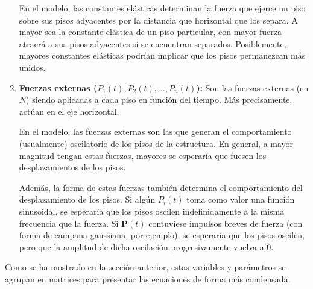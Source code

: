 \begin{enumerate}
        En el modelo, las constantes elásticas determinan la fuerza que ejerce un piso sobre sus pisos adyacentes por la distancia que horizontal que los separa. A mayor sea la constante elástica de un piso particular, con mayor fuerza atraerá a sus pisos adyacentes si se encuentran separados. Posiblemente, mayores constantes elásticas podrían implicar que los pisos permanezcan más unidos.

    \item \textbf{Fuerzas externas (\(P_1(t), P_2(t), \ldots, P_n(t)\)):} Son las fuerzas externas (en \(\si{N}\)) siendo aplicadas a cada piso en función del tiempo. Más precisamente, actúan en el eje horizontal.

        En el modelo, las fuerzas externas son las que generan el comportamiento (usualmente) oscilatorio de los pisos de la estructura. En general, a mayor magnitud tengan estas fuerzas, mayores se esperaría que fuesen los desplazamientos de los pisos.

        Además, la forma de estas fuerzas también determina el comportamiento del desplazamiento de los pisos. Si algún \(P_i(t)\) toma como valor una función sinusoidal, se esperaría que los pisos oscilen indefinidamente a la misma frecuencia que la fuerza. Si \(\mathbf{P}(t)\) contuviese impulsos breves de fuerza (con forma de campana gaussiana, por ejemplo), se esperaría que los pisos oscilen, pero que la amplitud de dicha oscilación progresivamente vuelva a 0.

\end{enumerate}

Como se ha mostrado en la sección anterior, estas variables y parámetros se agrupan en matrices para presentar las ecuaciones de forma más condensada.
